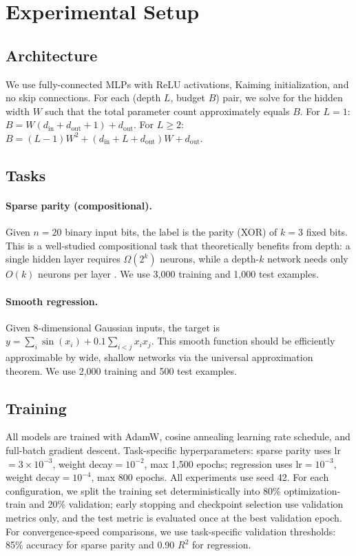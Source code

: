 \documentclass[11pt,a4paper]{article}
\begin{document}
\section{Experimental Setup}

\subsection{Architecture}

We use fully-connected MLPs with ReLU activations, Kaiming initialization, and no skip connections. For each (depth $L$, budget $B$) pair, we solve for the hidden width $W$ such that the total parameter count approximately equals $B$. For $L=1$: $B = W(d_\text{in} + d_\text{out} + 1) + d_\text{out}$. For $L \geq 2$: $B = (L{-}1)W^2 + (d_\text{in} + L + d_\text{out})W + d_\text{out}$.

\subsection{Tasks}

\paragraph{Sparse parity (compositional).} Given $n=20$ binary input bits, the label is the parity (XOR) of $k=3$ fixed bits. This is a well-studied compositional task that theoretically benefits from depth: a single hidden layer requires $\Omega(2^k)$ neurons, while a depth-$k$ network needs only $O(k)$ neurons per layer \citep{barak2022hidden}. We use 3{,}000 training and 1{,}000 test examples.

\paragraph{Smooth regression.} Given 8-dimensional Gaussian inputs, the target is $y = \sum_i \sin(x_i) + 0.1 \sum_{i<j} x_i x_j$. This smooth function should be efficiently approximable by wide, shallow networks via the universal approximation theorem. We use 2{,}000 training and 500 test examples.

\subsection{Training}

All models are trained with AdamW, cosine annealing learning rate schedule, and full-batch gradient descent. Task-specific hyperparameters: sparse parity uses lr$=3{\times}10^{-3}$, weight decay$=10^{-2}$, max 1{,}500 epochs; regression uses lr$=10^{-3}$, weight decay$=10^{-4}$, max 800 epochs. All experiments use seed 42. For each configuration, we split the training set deterministically into 80\% optimization-train and 20\% validation; early stopping and checkpoint selection use validation metrics only, and the test metric is evaluated once at the best validation epoch. For convergence-speed comparisons, we use task-specific validation thresholds: 85\% accuracy for sparse parity and 0.90 $R^2$ for regression.
\end{document}

